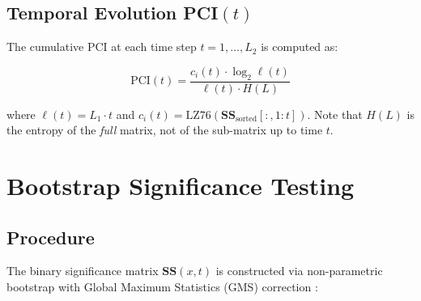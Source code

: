 \documentclass[11pt,a4paper]{article}
\begin{document}
\subsection{Temporal Evolution PCI$(t)$}

The cumulative PCI at each time step $t = 1, \ldots, L_2$ is computed as:

\begin{equation}
  \mathrm{PCI}(t) = \frac{c_i(t) \cdot \log_2 \ell(t)}{\ell(t) \cdot H(L)}
  \label{eq:pcicurve}
\end{equation}

where $\ell(t) = L_1 \cdot t$ and $c_i(t) = \mathrm{LZ76}(\mathbf{SS}_{\text{sorted}}[:, 1{:}t])$.
Note that $H(L)$ is the entropy of the \emph{full} matrix, not of the sub-matrix up to time $t$.

\section{Bootstrap Significance Testing}
\label{sec:bootstrap}

\subsection{Procedure}

The binary significance matrix $\mathbf{SS}(x, t)$ is constructed via non-parametric bootstrap
with Global Maximum Statistics (GMS) correction \cite{nichols2002}:
\end{document}
